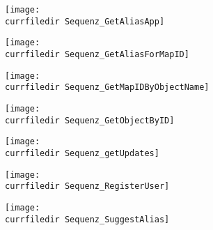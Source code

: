 \begin{figure}
    \centering
    \texttt{[image: \\currfiledir Sequenz\_GetAliasApp]}
\end{figure}

\begin{figure}
    \centering
    \texttt{[image: \\currfiledir Sequenz\_GetAliasForMapID]}
\end{figure}

\begin{figure}
    \centering
    \texttt{[image: \\currfiledir Sequenz\_GetMapIDByObjectName]}
\end{figure}

\begin{figure}
    \centering
    \texttt{[image: \\currfiledir Sequenz\_GetObjectByID]}
\end{figure}

\begin{figure}
    \centering
    \texttt{[image: \\currfiledir Sequenz\_getUpdates]}
\end{figure}

\begin{figure}
    \centering
    \texttt{[image: \\currfiledir Sequenz\_RegisterUser]}
\end{figure}

\begin{figure}
    \centering
    \texttt{[image: \\currfiledir Sequenz\_SuggestAlias]}
\end{figure}

